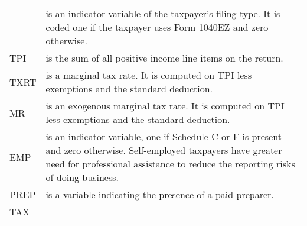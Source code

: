 \documentclass[]{book}
\begin{document}
\begin{longtable}[]{@{}ll@{}}
\begin{minipage}[t]{0.09\columnwidth}
\end{minipage} & \begin{minipage}[t]{0.86\columnwidth}\raggedright
is an indicator variable of the taxpayer's filing type. It is coded one if the taxpayer uses Form 1040EZ and zero otherwise.\strut
\end{minipage}\tabularnewline
\begin{minipage}[t]{0.09\columnwidth}\raggedright
TPI\strut
\end{minipage} & \begin{minipage}[t]{0.86\columnwidth}\raggedright
is the sum of all positive income line items on the return.\strut
\end{minipage}\tabularnewline
\begin{minipage}[t]{0.09\columnwidth}\raggedright
TXRT\strut
\end{minipage} & \begin{minipage}[t]{0.86\columnwidth}\raggedright
is a marginal tax rate. It is computed on TPI less exemptions and the standard deduction.\strut
\end{minipage}\tabularnewline
\begin{minipage}[t]{0.09\columnwidth}\raggedright
MR\strut
\end{minipage} & \begin{minipage}[t]{0.86\columnwidth}\raggedright
is an exogenous marginal tax rate. It is computed on TPI less exemptions and the standard deduction.\strut
\end{minipage}\tabularnewline
\begin{minipage}[t]{0.09\columnwidth}\raggedright
EMP\strut
\end{minipage} & \begin{minipage}[t]{0.86\columnwidth}\raggedright
is an indicator variable, one if Schedule C or F is present and zero otherwise. Self-employed taxpayers have greater need for professional assistance to reduce the reporting risks of doing business.\strut
\end{minipage}\tabularnewline
\begin{minipage}[t]{0.09\columnwidth}\raggedright
PREP\strut
\end{minipage} & \begin{minipage}[t]{0.86\columnwidth}\raggedright
is a variable indicating the presence of a paid preparer.\strut
\end{minipage}\tabularnewline
\begin{minipage}[t]{0.09\columnwidth}\raggedright
TAX\strut
\end{minipage} & \begin{minipage}[t]{0.86\columnwidth}\raggedright

\end{minipage}
\end{longtable}
\end{document}
